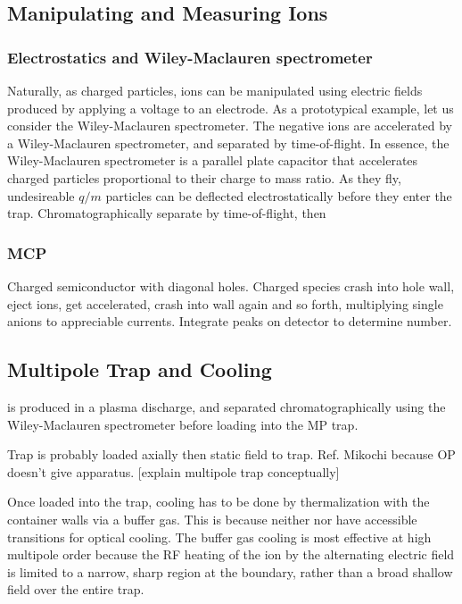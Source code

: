 \documentclass[12pt]{article}
\begin{document}
\subsection{Manipulating and Measuring Ions}
\subsubsection{Electrostatics and Wiley-Maclauren spectrometer}
Naturally, as charged particles, ions can be manipulated using electric fields produced by applying a voltage to an electrode. As a prototypical example, let us consider  the Wiley-Maclauren spectrometer. 
The negative ions are accelerated by a Wiley-Maclauren spectrometer, and separated by time-of-flight. In essence, the Wiley-Maclauren spectrometer is a parallel plate capacitor that accelerates charged particles proportional to their charge to mass ratio. As they fly, undesireable \( q/m \) particles can be deflected electrostatically before they enter the trap. Chromatographically separate by time-of-flight, then 

\subsubsection{MCP}
Charged semiconductor with diagonal holes. Charged species crash into hole wall, eject ions, get accelerated, crash into wall again and so forth, multiplying single anions to appreciable currents. Integrate peaks on detector to determine number.

\subsection{Multipole Trap and Cooling}
 is produced in a plasma discharge, and separated chromatographically using the Wiley-Maclauren spectrometer before loading into the MP trap.

Trap is probably loaded axially then static field to trap. Ref. Mikochi because OP doesn't give apparatus.
[explain multipole trap conceptually]

Once loaded into the trap, cooling has to be done by thermalization with the container walls via a buffer gas. This is because neither  nor  have accessible transitions for optical cooling. The buffer gas cooling is most effective at high multipole order because the RF heating of the ion by the alternating electric field is limited to a narrow, sharp region at the boundary, rather than a broad shallow field over the entire trap. 
\end{document}

